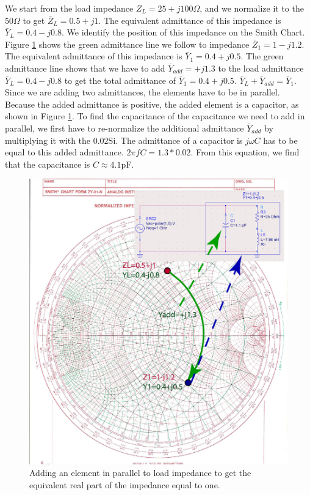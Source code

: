 \documentclass{ximera}
\begin{document}
We start from the load impedance  $Z_L=25+j 100 \Omega$, and we normalize it to the $50 \Omega$ to get $\bar{Z}_L=0.5+j1$. The equivalent admittance of this impedance is $\bar{Y}_L=0.4-j0.8$. We identify the position of this impedance on the Smith Chart. Figure \ref{fig:LumpedImpM1} shows the green admittance line we follow to impedance $\bar{Z}_1=1-j1.2$. The equivalent admittance of this impedance is   $\bar{Y}_1=0.4+j0.5$. The green admittance line shows that we have to add $\bar{Y}_{add}=+j1.3$ to the load admittance $\bar{Y}_L=0.4-j0.8$ to get the total admittance of $\bar{Y}_1=0.4+j0.5$. $\bar{Y}_L+\bar{Y}_{add}=\bar{Y}_1$. Since we are adding two admittances, the elements have to be in parallel. Because the added admittance is positive, the added element is a capacitor, as shown in Figure \ref{fig:LumpedImpM1}. To find the capacitance of the capacitance we need to add in parallel, we first have to re-normalize the additional admittance $\bar{Y}_{add}$ by multiplying it with the $0.02$Si. The admittance of a capacitor is $j \omega C$ has to be equal to this added admittance. $2 \pi f C = 1.3* 0.02$. From this equation, we find that the capacitance is $C \approx 4.1$pF. 
 


\begin{figure}[htbp]
\begin{center}
\includegraphics[scale=0.87]{../jpg/LumpedMatch2-01.jpg}
\end{center}
\caption{Adding an element in parallel to load impedance to get the equivalent real part of the impedance equal to one.}
\label{fig:LumpedImpM1}
\end{figure}
\end{document}
